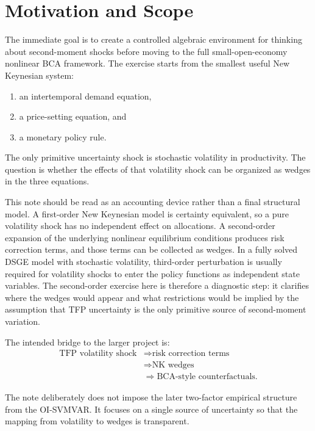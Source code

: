 \section{Motivation and Scope}

The immediate goal is to create a controlled algebraic environment for thinking
about second-moment shocks before moving to the full small-open-economy
nonlinear BCA framework. The exercise starts from the smallest useful New
Keynesian system:
\begin{enumerate}[label=(\roman*)]
    \item an intertemporal demand equation,
    \item a price-setting equation, and
    \item a monetary policy rule.
\end{enumerate}
The only primitive uncertainty shock is stochastic volatility in productivity.
The question is whether the effects of that volatility shock can be organized as
wedges in the three equations.

This note should be read as an accounting device rather than a final structural
model. A first-order New Keynesian model is certainty equivalent, so a pure
volatility shock has no independent effect on allocations. A second-order
expansion of the underlying nonlinear equilibrium conditions produces risk
correction terms, and those terms can be collected as wedges. In a fully solved
DSGE model with stochastic volatility, third-order perturbation is usually
required for volatility shocks to enter the policy functions as independent
state variables. The second-order exercise here is therefore a diagnostic step:
it clarifies where the wedges would appear and what restrictions would be
implied by the assumption that TFP uncertainty is the only primitive source of
second-moment variation.

The intended bridge to the larger project is:
\begin{align*}
    \text{TFP volatility shock}
    &\Rightarrow
    \text{risk correction terms}
    \\
    &\Rightarrow
    \text{NK wedges}
    \\
    &\Rightarrow
    \text{BCA-style counterfactuals}.
\end{align*}

The note deliberately does not impose the later two-factor empirical structure
from the OI-SVMVAR. It focuses on a single source of uncertainty so that the
mapping from volatility to wedges is transparent.
